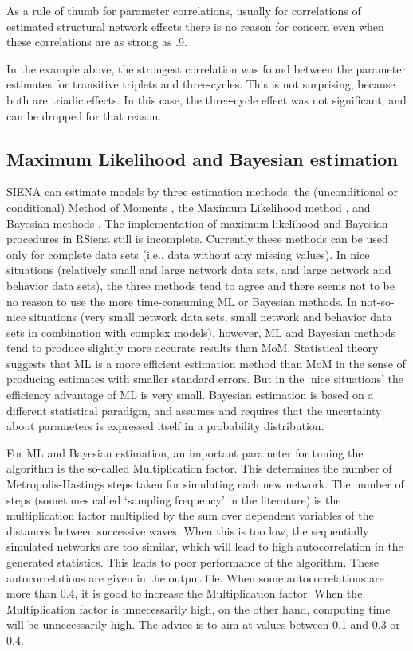 \documentclass[a4paper,fleqn,11pt]{article}
\newcommand{\+}{\, + \,}
\newcommand{\SI}{{\sf SIENA }}
\begin{document}
As a rule of thumb for parameter correlations,
usually for correlations of estimated structural network effects there is no
reason for concern even when these correlations
are as strong as .9.

In the example above, the strongest correlation was found between
the parameter estimates for transitive triplets and three-cycles.
This is not surprising, because both are triadic effects.
In this case, the three-cycle effect was not significant,
and can be dropped for that reason.


\subsection{Maximum Likelihood and Bayesian estimation}
\label{S_ML}
\label{S_Bayes}

\SI can estimate models by three estimation methods: the (unconditional or conditional)
Method of Moments \citep*[`MoM', the default; ][]{Snijders01, SnijdersEA07},
the Maximum Likelihood method \citep*[`ML', see][]{SnijdersEA10a},
and Bayesian methods
\citep[see][]{Koskinen04, KoskinenSnijders07, SchweinbergerSnijders07c}.
The implementation of maximum likelihood and Bayesian procedures
in RSiena still is incomplete. Currently these methods can be used
only for complete data sets (i.e., data without any missing values).
In nice situations (relatively small and large network data sets,
and large network and behavior data sets),
the three methods tend to agree
and there seems not to be no reason to use the more time-consuming
ML or Bayesian methods.
In not-so-nice situations (very small network data sets, small network and behavior
data sets in combination with complex models),
however, ML and Bayesian methods tend to produce slightly more accurate results
than MoM.
Statistical theory suggests that ML is a more efficient estimation method
than MoM in the sense of producing estimates with smaller standard errors.
But in the `nice situations' the efficiency advantage of ML is very small.
Bayesian estimation is based on a different statistical paradigm, and
assumes and requires that the uncertainty about parameters is expressed
itself in a probability distribution.

For ML and Bayesian estimation, an important parameter for tuning the
algorithm is the so-called \textsf{Multiplication factor}. This determines
the number of Metropolis-Hastings steps taken
for simulating each new network.
The number of steps (sometimes called `sampling frequency' in the literature)
is the multiplication factor multiplied by the sum over dependent variables
of the distances between successive waves.
When this is too low, the
sequentially simulated networks are too similar, which will
lead to high autocorrelation in the generated statistics.
This leads to poor performance of the algorithm.
These autocorrelations are given in the output file. When some
autocorrelations are more than 0.4, it is good to increase the
\textsf{Multiplication factor}.
When the \textsf{Multiplication factor} is unnecessarily high,
on the other hand, computing time will be unnecessarily high.
The advice is to aim at values between 0.1 and 0.3 or 0.4.
\end{document}
